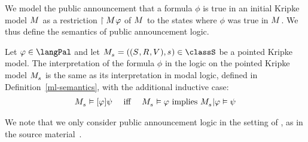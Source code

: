 We model the public announcement that a formula $\phi$ is true in an initial Kripke model $\kModel$ as a restriction $\restriction{\kModel}{\phi}$ of $\kModel$ to the states where $\phi$ was true in $\kModel$.
We thus define the semantics of public announcement logic.

\begin{definition}\label{pal-semantics}
Let $\phi \in \langPal$ and let $\kPModelAndTuple{\kStateS} \in \classS$ be a pointed Kripke model.
The interpretation of the formula $\phi$ in the logic \logicPalS{} on the pointed Kripke model $\kPModel{\kStateS}$ is the same as its interpretation in modal logic, defined in Definition~\ref{ml-semantics}, with the additional inductive case:
$$
\begin{array}{lcl}
\kPModel{\kStateS} \entails \announceA{\phi} \psi & \text{ iff } & \kPModel{\kStateS} \entails \phi \text{ implies } \restrict{\kPModel{\kStateS}}{\phi} \entails \psi
\end{array}
$$
\end{definition}

We note that we only consider public announcement logic in the setting of \classS{}, as in the source material~\cite{plaza:1989}.

